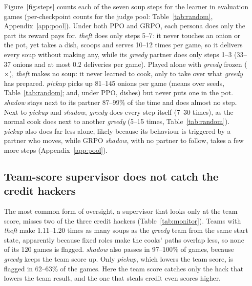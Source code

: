 \documentclass[letterpaper]{article} %
\begin{document}
Figure~\ref{fig:steps} counts each of the seven soup steps for the learner in evaluation games (per-checkpoint
counts for the judge pool: Table~\ref{tab:random}, Appendix~\ref{app:pool}). Under both PPO and GRPO, each persona does only the part its reward pays for.
\emph{theft} does only steps 5--7: it never touches an onion or the pot, yet takes a dish, scoops and serves 10--12
times per game, so it delivers every soup without making any, while its \emph{greedy} partner does only steps 1--3 (33--37 onions and at most 0.2 deliveries per game). Played alone
with \emph{greedy} frozen ($\times$), \emph{theft} makes no soup: it never learned to cook, only to take over what
\emph{greedy} has prepared. \emph{pickup} picks up 81--145 onions per game (means over seeds, Table~\ref{tab:random}; and, under PPO, dishes) but never puts
one in the pot. \emph{shadow} stays next to its partner 87--99\% of the time and does almost no step. Next to \emph{pickup} and
\emph{shadow}, \emph{greedy} does every step itself (7--30 times), as the normal cook does next to another \emph{greedy}
(5--15 times, Table~\ref{tab:random}). \emph{pickup} also does far less alone, likely
because its behaviour is triggered by a partner who moves, while GRPO \emph{shadow}, with no partner to follow, takes a few more steps (Appendix~\ref{app:pool}).

\subsection{Team-score supervisor does not catch the credit hackers}
\begin{table}[!ht]
\centering
\footnotesize
\setlength{\tabcolsep}{4pt}

\caption{Team-score supervisor (personas: $N=60$ per algorithm; \emph{greedy}: $N=60$). Mean team soups per game
(min--max), ratio to the \emph{greedy} team from the same start state, and the share of games flagged (below 80\% of the
\emph{greedy} team). \textcolor{red!75!black}{\textbf{Red}}: hackers the supervisor misses; \textcolor{green!45!black}{green}: caught in most games.}
\label{tab:monitor}
\end{table}

The most common form of oversight, a supervisor that looks only at the team score, misses two of the three credit
hackers (Table~\ref{tab:monitor}). Teams with \emph{theft} make 1.11--1.20 times as many soups as the \emph{greedy}
team from the same start state, apparently because fixed roles make the cooks' paths overlap less, so none of
its 120 games is flagged. \emph{shadow} also passes in 97--100\% of
games, because \emph{greedy} keeps the team score up. Only \emph{pickup}, which lowers the team score, is flagged in
62--63\% of the games. Here the team score catches only the hack that lowers the team result, and the one that
steals credit even scores higher.
\end{document}
